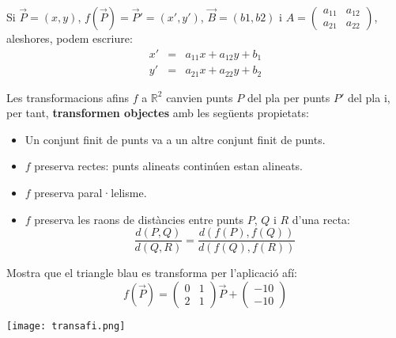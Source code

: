 \documentclass{beamer}
\begin{document}
\begin{frame}
  Si $\overrightarrow{P}=(x,y)$, $f(\overrightarrow{P})=\overrightarrow{P}'= (x',y')$, $\overrightarrow{B}=(b1,b2)$ i $A=\begin{pmatrix}a_{11}&a_{12}\\a_{21}&a_{22}\end{pmatrix}$,
  aleshores, podem escriure:
  \begin{eqnarray*}
    x'&=&a_{11}x+a_{12}y+b_1\\
    y'&=&a_{21}x+a_{22}y+b_2
  \end{eqnarray*}
\end{frame}

\begin{frame}
  Les transformacions afins $f$ a $\mathbb{R}^2$ canvien punts $P$ del pla per punts $P'$ del pla i, per tant, {\bf transformen objectes} amb les següents propietats:
\begin{itemize}
  \item Un conjunt finit de punts va a un altre conjunt finit de punts.
  \item $f$ preserva rectes: punts alineats continúen estan alineats.
  \item $f$ preserva paral·lelisme.
  \item $f$ preserva les raons de distàncies entre punts $P$, $Q$ i $R$ d'una recta:
  \[
    \frac{d(P,Q)}{d(Q,R)}=\frac{d(f(P),f(Q))}{d(f(Q),f(R))}
  \]
\end{itemize}
\end{frame}

\begin{frame}
  \begin{exercici}{}
    Mostra que el triangle blau es transforma per l'aplicació afí:
    \[
      f(\overrightarrow{P})=
        \begin{pmatrix}0&1\\2&1\end{pmatrix} \overrightarrow{P} +
        \begin{pmatrix}-10\\-10\end{pmatrix}
    \]
    \begin{center}
      \texttt{[image: transafi.png]}
    \end{center}
  \end{exercici}
\end{frame}
\end{document}
